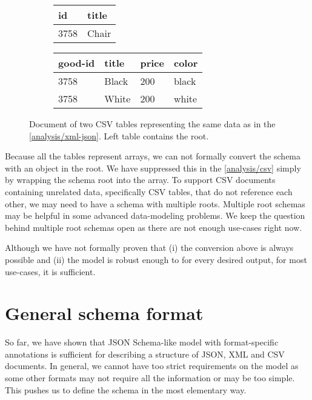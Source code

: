\begin{figure}[h!]\centering
  \begin{subfigure}{.5\textwidth}
    \centering
    \begin{tabular}{ll}\toprule
      id   & title \\ \midrule
      3758 & Chair \\ \bottomrule
    \end{tabular}%
  \end{subfigure}%
  \begin{subfigure}{.5\textwidth}
    \centering
    \begin{tabular}{llll}\toprule
      good-id & title & price & color \\ \midrule
      3758 & Black & 200 & black \\
      3758 & White & 200 & white \\ \bottomrule
    \end{tabular}
  \end{subfigure}
  \caption{Document of two CSV tables representing the same data as in the \autoref{analysis/xml-json}. Left table contains the root.}
  \label{analysis/csv}
\end{figure}

Because all the tables represent arrays, we can not formally convert the schema with an object in the root. We have suppressed this in the \autoref{analysis/csv} simply by wrapping the schema root into the array. To support CSV documents containing unrelated data, specifically CSV tables, that do not reference each other, we may need to have a schema with multiple roots. Multiple root schemas may be helpful in some advanced data-modeling problems. We keep the question behind multiple root schemas open as there are not enough use-cases right now.

Although we have not formally proven that (i) the conversion above is always possible and (ii) the model is robust enough to for every desired output, for most use-cases, it is sufficient.

\section*{General schema format}

So far, we have shown that JSON Schema-like model with format-specific annotations is sufficient for describing a structure of JSON, XML and CSV documents. In general, we cannot have too strict requirements on the model as some other formats may not require all the information or may be too simple. This pushes us to define the schema in the most elementary way.

